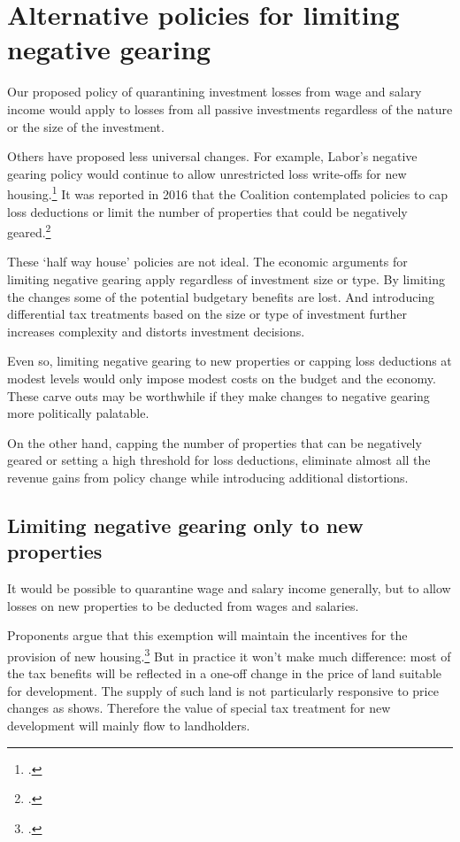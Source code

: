 \documentclass{grattanAlpha}\usepackage[]{graphicx}\usepackage[]{color}
\begin{document}
\section{Alternative policies for limiting negative gearing}
Our proposed policy of quarantining investment losses from wage and salary income would apply to losses from all passive investments regardless of the nature or the size of the investment. 

Others have proposed less universal changes. For example, Labor’s negative gearing policy would continue to allow unrestricted loss write-offs for new housing.\footcite{ALP2016PositivePlanHousing} It was reported in 2016 that the Coalition contemplated policies to cap loss deductions or limit the number of properties that could be negatively geared.\footcite{Coorey2016}  

These ‘half way house’ policies are not ideal. The economic arguments for limiting negative gearing apply regardless of investment size or type. By limiting the changes some of the potential budgetary benefits are lost. And introducing differential tax treatments based on the size or type of investment further increases complexity and distorts investment decisions. 

Even so, limiting negative gearing to new properties or capping loss deductions at modest levels would only impose modest costs on the budget and the economy. These carve outs may be worthwhile if they make changes to negative gearing more politically palatable.

On the other hand, capping the number of properties that can be negatively geared or setting a high threshold for loss deductions, eliminate almost all the revenue gains from policy change while introducing additional distortions. 

\subsection{Limiting negative gearing only to new properties}
It would be possible to quarantine wage and salary income generally, but to allow losses on new properties to be deducted from wages and salaries. 

Proponents argue that this exemption will maintain the incentives for the provision of new housing.\footcite[][28]{McKellInstitute2015SwitchingGears}  But in practice it won’t make much difference: most of the tax benefits will be reflected in a one-off change in the price of land suitable for development. The supply of such land is not particularly responsive to price changes as  shows. Therefore the value of special tax treatment for new development will mainly flow to landholders. 
\end{document}
